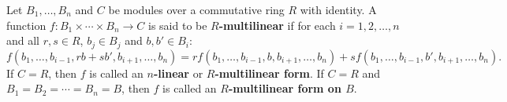 Let $B_1, \ldots, B_n$ and $C$ be modules over a commutative ring $R$ with identity. A function $f: B_1 \times \cdots \times B_n \to C$ is said to be \textbf{$R$-multilinear} if for each $i = 1, 2, \ldots, n$ and all $r, s \in R$, $b_j \in B_j$ and $b, b' \in B_i$:
\[
f(b_1, \ldots, b_{i-1}, rb + sb', b_{i+1}, \ldots, b_n) = r f(b_1, \ldots, b_{i-1}, b, b_{i+1}, \ldots, b_n) + s f(b_1, \ldots, b_{i-1}, b', b_{i+1}, \ldots, b_n).
\]
If $C = R$, then $f$ is called an \textbf{$n$-linear} or \textbf{$R$-multilinear form}. If $C = R$ and $B_1 = B_2 = \cdots = B_n = B$, then $f$ is called an \textbf{$R$-multilinear form on $B$}.
